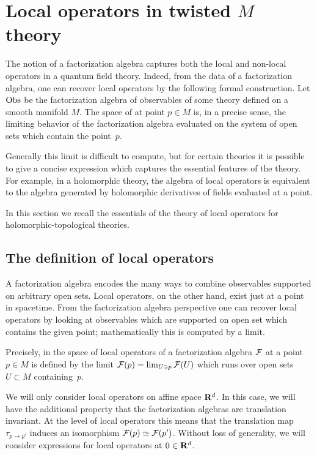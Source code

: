 %
%
%

\section{Local operators in twisted $M$ theory}

The notion of a factorization algebra captures both the local and non-local operators in a quantum field theory. 
Indeed, from the data of a factorization algebra, one can recover local operators by the following formal construction. 
Let $\operatorname{Obs}$ be the factorization algebra of observables of some theory defined on a smooth manifold $M$.
The space of  at point $p \in M$ is, in a precise sense, the limiting behavior of the factorization algebra evaluated on the system of open sets which contain the point~$p$. 

Generally this limit is difficult to compute, but for certain theories it is possible to give a concise expression which captures the essential features of the theory.
For example, in a holomorphic theory, the algebra of local operators is equivalent to the algebra generated by holomorphic derivatives of fields evaluated at a point.

In this section we recall the essentials of the theory of local operators for holomorphic-topological theories. 

\subsection{The definition of local operators}

A factorization algebra encodes the many ways to combine observables supported on arbitrary open sets. 
Local operators, on the other hand, exist just at a point in spacetime.
From the factorization algebra perspective one can recover local operators by looking at observables which are supported on  open set which contains the given point; mathematically this is computed by a limit. 

Precisely, in \cite[Definition 10.1.0.1]{CG2} the space of local operators of a factorization algebra $\mathcal F$ at a point $p \in M$ is defined by the limit $\mathcal F(p) = \lim_{U \ni p} \mathcal F(U)$ which runs over open sets $U \subset M$ containing~$p$.

We will only consider local operators on affine space $\mathbf{R}^d$. 
In this case, we will have the additional property that the factorization algebras are translation invariant.
At the level of local operators this means that the translation map $\tau_{p \to p'}$ induces an isomorphism $\mathcal F(p) \simeq \mathcal F(p')$. 
Without loss of generality, we will consider expressions for local operators at $0 \in \mathbf{R}^d$.

